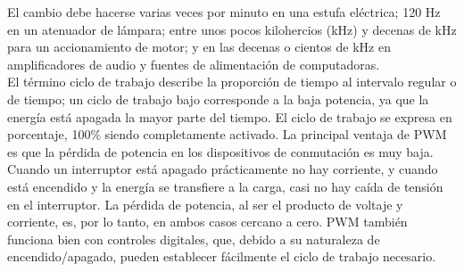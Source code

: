 El cambio debe hacerse varias veces por minuto en una estufa eléctrica; 120 Hz en un atenuador de lámpara; entre unos pocos kilohercios (kHz) y decenas de kHz para un accionamiento
de motor; y en las decenas o cientos de kHz en amplificadores de audio y fuentes de alimentación de computadoras.\\


El término ciclo de trabajo describe la proporción de tiempo  al intervalo regular o  de tiempo; un ciclo de trabajo bajo corresponde a la baja potencia,
ya que la energía está apagada la mayor parte del tiempo. El ciclo de trabajo se expresa en porcentaje, 100\% siendo completamente activado.
La principal ventaja de PWM es que la pérdida de potencia en los dispositivos de conmutación es muy baja. Cuando un interruptor está apagado prácticamente no hay corriente, y 
cuando está encendido y la energía se transfiere a la carga, casi no hay caída de tensión en el interruptor. La pérdida de potencia, al ser el producto de voltaje y corriente, es,
por lo tanto, en ambos casos cercano a cero. PWM también funciona bien con controles digitales, que, debido a su naturaleza de encendido/apagado, pueden establecer fácilmente el 
ciclo de trabajo necesario.\\
